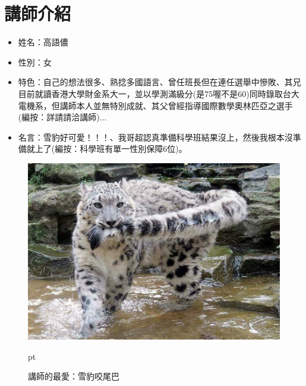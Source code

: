 \section{講師介紹}
\begin{itemize}
\item 姓名：高語儂
\item 性別：女
\item 特色：自己的想法很多、熟捻多國語言、曾任班長但在連任選舉中慘敗、其兄目前就讀香港大學財金系大一，並以學測滿級分(是75喔不是60)同時錄取台大電機系，但講師本人並無特別成就、其父曾經指導國際數學奧林匹亞之選手(編按：詳請請洽講師)...
\item 名言：雪豹好可愛！！！、我哥超認真準備科學班結果沒上，然後我根本沒準備就上了(編按：科學班有單一性別保障6位)。
\end{itemize}

\begin{figure}[H]
\graphicspath{{biology/}}
\includegraphics[width=12cm, center]{snowLeopard.jpg}
\caption{講師的最愛：雪豹咬尾巴}  pt
\label{fig:snowLeopard}
\end{figure}